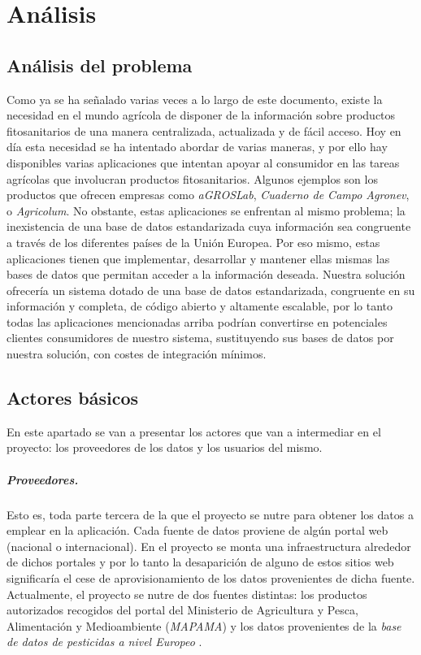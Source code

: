 \chapter{Análisis} \label{analisis}
\section{Análisis del problema} \label{analisis.problema}
Como ya se ha señalado varias veces a lo largo de este documento, existe la necesidad en el mundo agrícola de disponer de la información sobre productos fitosanitarios de una manera centralizada, actualizada y de fácil acceso. Hoy en día esta necesidad se ha intentado abordar de varias maneras, y por ello hay disponibles varias aplicaciones que intentan apoyar al consumidor en las tareas agrícolas que involucran productos fitosanitarios. Algunos ejemplos son los productos que ofrecen empresas como \textit{aGROSLab}, \textit{Cuaderno de Campo Agronev}, o \textit{Agricolum}. No obstante, estas aplicaciones se enfrentan al mismo problema; la inexistencia de una base de datos estandarizada cuya información sea congruente a través de los diferentes países de la Unión Europea. Por eso mismo, estas aplicaciones tienen que implementar, desarrollar y mantener ellas mismas las bases de datos que permitan acceder a la información deseada. Nuestra solución ofrecería un sistema dotado de una base de datos estandarizada, congruente en su información y completa, de código abierto y altamente escalable, por lo tanto todas las aplicaciones mencionadas arriba podrían convertirse en potenciales clientes consumidores de nuestro sistema, sustituyendo sus bases de datos por nuestra solución, con costes de integración mínimos.

\section{Actores básicos} \label{analisis.marco}
En este apartado se van a presentar los actores que van a intermediar en el proyecto: los proveedores de los datos y los usuarios del mismo. 
\paragraph*{Proveedores.} Esto es, toda parte tercera de la que el proyecto se nutre para obtener los datos a emplear en la aplicación. Cada fuente de datos proviene de algún portal web (nacional o internacional). En el proyecto se monta una infraestructura alrededor de dichos portales y por lo tanto la desaparición de alguno de estos sitios web significaría el cese de aprovisionamiento de los datos provenientes de dicha fuente. Actualmente, el proyecto se nutre de dos fuentes distintas: los productos autorizados recogidos del portal del Ministerio de Agricultura y Pesca, Alimentación y Medioambiente (\textit{MAPAMA}) \cite{mapama} y los datos provenientes de la \textit{base de datos de pesticidas a nivel Europeo} \cite{pesticidesdb}.

